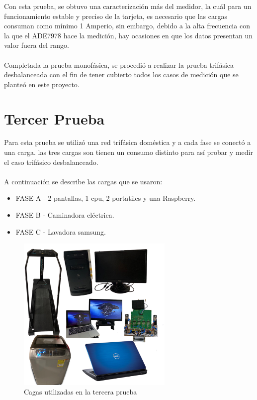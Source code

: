   Con esta prueba, se obtuvo una caracterización más del medidor, la cuál para un funcionamiento estable y preciso de la tarjeta, es necesario que las cargas consuman como mínimo 1 Amperio, sin embargo, debido a la alta frecuencia con la que el ADE7978 hace la medición, hay ocasiones en que los datos presentan un valor fuera del rango. \\\\
  Completada la prueba monofásica, se procedió a realizar la prueba trifásica desbalanceada con el fin de tener cubierto todos los casos de medición que se planteó en este proyecto.
  \section{Tercer Prueba}

  Para esta prueba se utilizó una red trifásica doméstica y a cada fase se conectó a una carga. las tres cargas son tienen un consumo distinto para así probar y medir el caso trifásico desbalanceado.\\\\
  A continuación se describe las cargas que se usaron:\\
  \begin{itemize}
    \itemsep0em
    \item FASE A - 2 pantallas, 1 cpu, 2 portatiles y una Raspberry.
    \item FASE B - Caminadora eléctrica.
    \item FASE C - Lavadora samsung.
  \end{itemize}
    \begin{figure}[H]
      \begin{center}
          \includegraphics[width = 7.5cm]{4Resultados/prueba2.png}
          \caption{ Cagas utilizadas en la tercera prueba} 
          \label{fig:cargas-3}
     \end{center}
    \end{figure}
